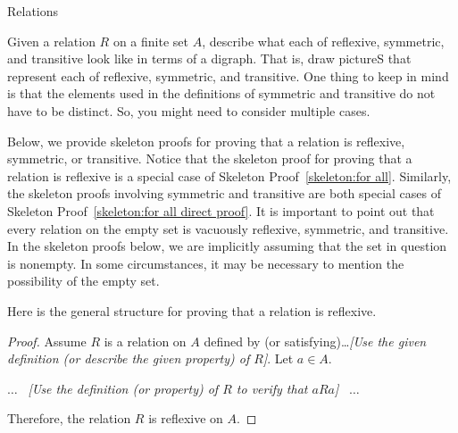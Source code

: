 \begin{section}{Relations}
%

\begin{problem}
Given a relation $R$ on a finite set $A$, describe what each of reflexive, symmetric, and transitive look like in terms of a digraph. That is, draw pictureS that represent each of reflexive, symmetric, and transitive. One thing to keep in mind is that the elements used in the definitions of symmetric and transitive do not have to be distinct.  So, you might need to consider multiple cases.
\end{problem}


Below, we provide skeleton proofs for proving that a relation is reflexive, symmetric, or transitive.  Notice that the skeleton proof for proving that a relation is reflexive is a special case of Skeleton Proof~\ref{skeleton:for all}. Similarly, the skeleton proofs involving symmetric and transitive are both special cases of Skeleton Proof~\ref{skeleton:for all direct proof}. It is important to point out that every relation on the empty set is vacuously reflexive, symmetric, and transitive.  In the skeleton proofs below, we are implicitly assuming that the set in question is nonempty.  In some circumstances, it may be necessary to mention the possibility of the empty set.

\begin{skeleton}
Here is the general structure for proving that a relation is reflexive. 

\begin{mdframed}[style=skeleton]
\begin{proof}
Assume $R$ is a relation on $A$ defined by (or satisfying)\ldots \emph{[Use the given definition (or describe the given property) of $R$]}.  Let $a\in A$.
\begin{center}
$\ldots$ \ \emph{[Use the definition (or property) of $R$ to verify that $aR a$]} \ $\ldots$
\end{center}
\noindent Therefore, the relation $R$ is reflexive on $A$.
\end{proof}
\end{mdframed}
\end{skeleton}


\end{section}
